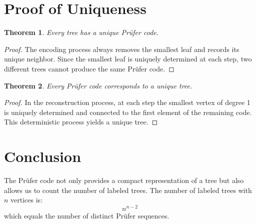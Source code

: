 \documentclass{article}
\newtheorem{theorem}{Theorem}
\begin{document}
	\section{Proof of Uniqueness}
	\begin{theorem}
		Every tree has a unique Prüfer code.
	\end{theorem}
	\begin{proof}
		The encoding process always removes the smallest leaf and records its unique neighbor. Since the smallest leaf is uniquely determined at each step, two different trees cannot produce the same Prüfer code.
	\end{proof}
	
	\begin{theorem}
		Every Prüfer code corresponds to a unique tree.
	\end{theorem}
	\begin{proof}
		In the reconstruction process, at each step the smallest vertex of degree 1 is uniquely determined and connected to the first element of the remaining code. This deterministic process yields a unique tree.
	\end{proof}
	
	\section{Conclusion}
	The Prüfer code not only provides a compact representation of a tree but also allows us to count the number of labeled trees. The number of labeled trees with $n$ vertices is:
	\[
	n^{n-2}
	\]
	which equals the number of distinct Prüfer sequences.
	
\end{document}
